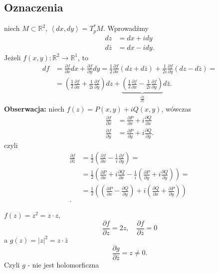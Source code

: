 \documentclass[../main.tex]{subfiles}
\begin{document}
    \subsection{Oznaczenia}
    niech $M\subset\mathbb{R}^2$, $\left<dx, dy \right> = T_p^* M$. Wprowadźmy
    \begin{align*}
        dz &= dx + idy\\
        d\bar{z} &= dx - idy
    .\end{align*}
    Jeżeli $f(x,y): \mathbb{R}^2\to \mathbb{R}^1$, to
    \begin{align*}
        df &= \frac{\partial f}{\partial x} dx + \frac{\partial f}{\partial y} dy = \frac{1}{2} \frac{\partial f}{\partial x} \left( dz + d\bar{z} \right) + \frac{1}{2i} \frac{\partial f}{\partial y} \left( dz - d\bar{z} \right) =\\
        &= \left( \frac{1}{2}\frac{\partial f}{\partial x} + \frac{1}{2i}\frac{\partial f}{\partial y}  \right) dz + \underbrace{\left( \frac{1}{2}\frac{\partial f}{\partial x} - \frac{1}{2i}\frac{\partial f}{\partial y}  \right)}_{\frac{\partial f}{\partial \bar{z}} }d\bar{z}
    .\end{align*}
\textbf{Obserwacja:} niech $f(z) = P(x,y) + i Q(x,y)$, wówczas
\begin{align*}
    \frac{\partial f}{\partial x} &= \frac{\partial P}{\partial x} + i \frac{\partial Q}{\partial x} \\ \frac{\partial f}{\partial y} &= \frac{\partial P}{\partial y} + i \frac{\partial Q}{\partial y}
.\end{align*}
czyli
\begin{align*}
    \frac{\partial f}{\partial \bar{z}} &= \frac{1}{2} \left( \frac{\partial f}{\partial x} - \frac{1}{i} \frac{\partial f}{\partial y}  \right) = \\
    &= \frac{1}{2} \left( \frac{\partial P}{\partial x} + i \frac{\partial Q}{\partial x} - \frac{1}{i}\left( \frac{\partial P}{\partial y} + i \frac{\partial Q}{\partial y}  \right)  \right)  =\\
    &= \frac{1}{2} \left(\left( \frac{\partial P}{\partial x}  - \frac{\partial Q}{\partial y}  \right) + i \left(\frac{\partial Q}{\partial x} + \frac{\partial P}{\partial y}\right)\right)  \\
.\end{align*}
\begin{przyklad}
    $f(z) = z^2 = z\cdot z$,\\
    \[
        \frac{\partial f}{\partial z} = 2z,\quad \frac{\partial f}{\partial \bar{z}} = 0
    \]
    a $g(z) = |z|^2 = z\cdot \bar{z}$
    \[
        \frac{\partial g}{\partial \bar{z}} = z \neq 0
    .\] Czyli $g$ - nie jest holomorficzna
\end{przyklad}
\end{document}
